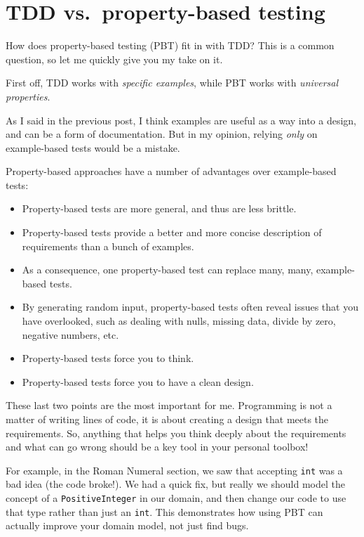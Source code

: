 \section{TDD vs.~property-based
testing}
\label{tdd-vs.property-based-testing}

How does property-based testing (PBT) fit in with TDD? This is a common
question, so let me quickly give you my take on it.

First off, TDD works with \emph{specific examples}, while PBT works with
\emph{universal properties}.

As I said in the previous post, I think examples are useful as a way
into a design, and can be a form of documentation. But in my opinion,
relying \emph{only} on example-based tests would be a mistake.

Property-based approaches have a number of advantages over example-based
tests:

\begin{itemize}
\item
  Property-based tests are more general, and thus are less brittle.
\item
  Property-based tests provide a better and more concise description of
  requirements than a bunch of examples.
\item
  As a consequence, one property-based test can replace many, many,
  example-based tests.
\item
  By generating random input, property-based tests often reveal issues
  that you have overlooked, such as dealing with nulls, missing data,
  divide by zero, negative numbers, etc.
\item
  Property-based tests force you to think.
\item
  Property-based tests force you to have a clean design.
\end{itemize}

These last two points are the most important for me. Programming is not
a matter of writing lines of code, it is about creating a design that
meets the requirements.
So, anything that helps you think deeply about the requirements and what
can go wrong should be a key tool in your personal toolbox!

For example, in the Roman Numeral section, we saw that accepting
\texttt{int} was a bad idea (the code broke!). We had a quick fix, but
really we should model the concept of a \texttt{PositiveInteger} in our
domain, and then change our code to use that type rather than just an
\texttt{int}. This demonstrates how using PBT can actually improve your
domain model, not just find bugs.


